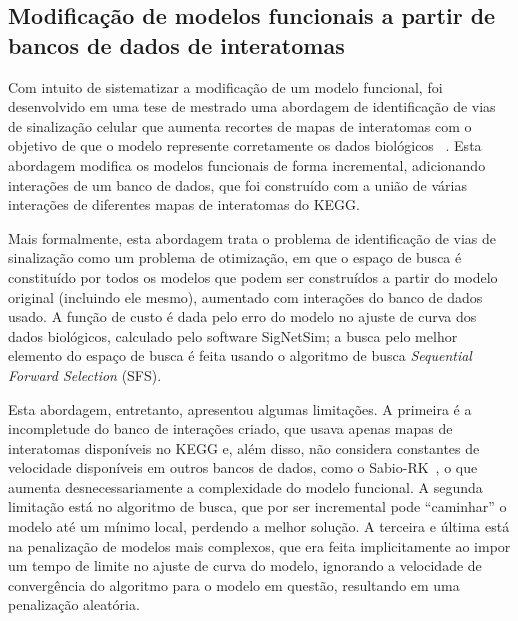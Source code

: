 \documentclass[12pt]{article}
\begin{document}

\subsection{Modificação de modelos funcionais a partir de bancos de 
dados de interatomas}
Com intuito de sistematizar a modificação de um modelo funcional, foi
desenvolvido em uma tese de mestrado uma abordagem de identificação de
vias de sinalização celular que aumenta recortes de mapas de interatomas
com o objetivo de que o modelo represente corretamente os dados biológicos 
~\cite{Wu2015metodo}. Esta abordagem modifica os modelos funcionais de 
forma incremental, adicionando interações de um banco de dados, que foi 
construído com a união de várias interações de diferentes mapas de 
interatomas do KEGG.

Mais formalmente, esta abordagem trata o problema de identificação de 
vias de sinalização como um problema de otimização, em que o espaço de
busca é constituído por todos os modelos que podem ser construídos a 
partir do modelo original (incluindo ele mesmo), aumentado com
interações do banco de dados usado. A função de custo é dada pelo erro
do modelo no ajuste de curva dos dados biológicos, calculado pelo 
software SigNetSim; a busca pelo melhor elemento do espaço de busca é 
feita usando o algoritmo de busca {\it Sequential Forward Selection} 
(SFS).


Esta abordagem, entretanto, apresentou algumas limitações. A primeira é 
a incompletude do banco de interações criado, que usava apenas mapas de 
interatomas disponíveis no KEGG e, além disso, não considera constantes 
de velocidade disponíveis em outros bancos de dados, como o 
Sabio-RK~\cite{doi:10.1093/nar/gkr1046}, 
o que aumenta desnecessariamente a complexidade do modelo 
funcional. A segunda limitação está no algoritmo de busca, que por ser
incremental pode ``caminhar'' o modelo até um mínimo local, perdendo a 
melhor solução. A terceira e última está na penalização de modelos mais 
complexos, que era feita implicitamente ao impor um tempo de limite 
no ajuste de curva do modelo, ignorando a velocidade de convergência do
algoritmo para o modelo em questão, resultando em uma penalização 
aleatória.


\end{document}
